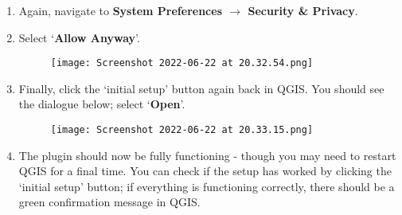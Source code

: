\begin{enumerate}
    \item Again, navigate to \textbf{System Preferences $\rightarrow$ Security \& Privacy}.
    
    \item Select `\textbf{Allow Anyway}'.
    \begin{figure}[h!]
        \centering
        \texttt{[image: Screenshot 2022-06-22 at 20.32.54.png]}
        \label{fig:mac5}
    \end{figure}
    \clearpage
    
    \item Finally, click the `initial setup' button again back in QGIS. You should see the dialogue below; select `\textbf{Open}'.
    \begin{figure}[h!]
        \centering
        \texttt{[image: Screenshot 2022-06-22 at 20.33.15.png]}
        \label{fig:mac6}
    \end{figure}
    
    \item The plugin should now be fully functioning - though you may need to restart QGIS for a final time. You can check if the setup has worked by clicking the `initial setup' button; if everything is functioning correctly, there should be a green confirmation message in QGIS.
    
\end{enumerate}